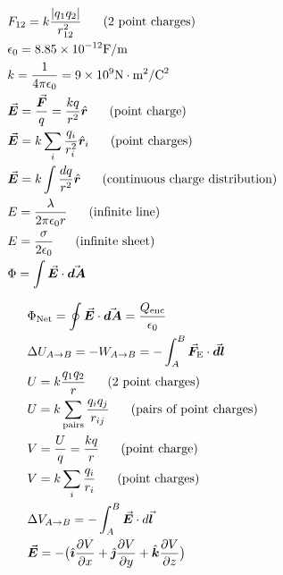 \documentclass[9pt,letterpaper]{article}
\newcommand{\vect}[1]{\vec{\boldsymbol{#1}}}
\newcommand{\vhat}[1]{\hat{\boldsymbol{#1}}}
\begin{document}
\newpage
\begin{minipage}[t]{0.50\linewidth}
\begin{align*}
    &F_{12} = k\frac{|q_{1}q_{2}|}{r_{12}^{2}} \hspace{0.05\linewidth}\text{(2 point charges)}\\
    &\epsilon_{0} = 8.85 \times 10^{-12} \text{F}/\text{m}\\
    &k = \frac{1}{4 \pi \epsilon_{0}} = 9 \times 10^{9} \text{N}\cdot\text{m}^{2}/\text{C}^{2}\\
    &\vect{E} = \frac{\vect{F}}{q} = \frac{kq}{r^{2}}\vhat{r} \hspace{0.05\linewidth}\text{(point charge)}\\
    &\vect{E} = k\sum_{i}\frac{q_{i}}{r_{i}^{2}}\vhat{r}_{i} \hspace{0.05\linewidth}\text{(point charges)}\\
    &\vect{E} = k\int\frac{dq}{r^{2}}\vhat{r} \hspace{0.05\linewidth}\text{(continuous charge distribution)}\\
    &E = \frac{\lambda}{2\pi\epsilon_{0}r} \hspace{0.05\linewidth}\text{(infinite line)}\\
    &E = \frac{\sigma}{2\epsilon_{0}} \hspace{0.05\linewidth}\text{(infinite sheet)}\\
    &\Phi =\int \vect{E}\cdot\vect{dA}\\
\end{align*}
\end{minipage}
\begin{minipage}[t]{0.50\linewidth}
\begin{align*}
    &\Phi_{\text{Net}} =\oint \vect{E}\cdot \vect{dA}=\frac{Q_{\text{enc}}}{\epsilon_{0}}\\
    &\Delta U_{A\to B} = -W_{A\to B} = -\int_{A}^{B}\vect{F}_{\text{E}} \cdot \vect{dl}\\
    &U = k\frac{q_{1}q_{2}}{r} \hspace{0.05\linewidth}\text{(2 point charges)} \\
    &U = k\sum_{\text{pairs}}\frac{q_{i}q_{j}}{r_{ij}} \hspace{0.05\linewidth}\text{(pairs of point charges)} \\
    &V = \frac{U}{q} = \frac{kq}{r} \hspace{0.05\linewidth}\text{(point charge)}\\
    &V = k\sum_{i}\frac{q_{i}}{r_{i}}\hspace{0.05\linewidth}\text{(point charges)}\\
    &\Delta V_{A\to B} = -\int_{A}^{B} \vect{E}\cdot d\vect{l}\\
    &\vect{E} = -\bigl( \vhat{\imath} \frac{\partial V}{\partial x} + \vhat{\jmath} \frac{\partial V}{\partial y} + \vhat{k} \frac{\partial V}{\partial z} \bigr)\\
\end{align*}
\end{minipage}
\end{document}
